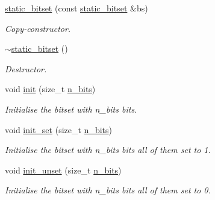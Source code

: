 \begin{DoxyCompactItemize}
\mbox{\label{classlgraph_1_1utils_1_1static__bitset_a683aec1377830f07c5d5f53f969be569}} 
\hyperlink{classlgraph_1_1utils_1_1static__bitset_a683aec1377830f07c5d5f53f969be569}{static\+\_\+bitset} (const \hyperlink{classlgraph_1_1utils_1_1static__bitset}{static\+\_\+bitset} \&bs)
\begin{DoxyCompactList}\small\item\em Copy-\/constructor. \end{DoxyCompactList}\item 
\mbox{\label{classlgraph_1_1utils_1_1static__bitset_aabbb46d8283fffa38b39204b204999be}} 
\hyperlink{classlgraph_1_1utils_1_1static__bitset_aabbb46d8283fffa38b39204b204999be}{$\sim$static\+\_\+bitset} ()
\begin{DoxyCompactList}\small\item\em Destructor. \end{DoxyCompactList}\item 
void \hyperlink{classlgraph_1_1utils_1_1static__bitset_afad1ede9e08c9d59b641150d2203edca}{init} (size\+\_\+t \hyperlink{classlgraph_1_1utils_1_1static__bitset_aebc02986838d70f13d3c10f390d11211}{n\+\_\+bits})
\begin{DoxyCompactList}\small\item\em Initialise the bitset with {\itshape n\+\_\+bits} bits. \end{DoxyCompactList}\item 
void \hyperlink{classlgraph_1_1utils_1_1static__bitset_a706ac4c15ed634b9087582cacc107acc}{init\+\_\+set} (size\+\_\+t \hyperlink{classlgraph_1_1utils_1_1static__bitset_aebc02986838d70f13d3c10f390d11211}{n\+\_\+bits})
\begin{DoxyCompactList}\small\item\em Initialise the bitset with {\itshape n\+\_\+bits} bits all of them set to 1. \end{DoxyCompactList}\item 
void \hyperlink{classlgraph_1_1utils_1_1static__bitset_a6fb4d66f266593fe9c65451bf6212591}{init\+\_\+unset} (size\+\_\+t \hyperlink{classlgraph_1_1utils_1_1static__bitset_aebc02986838d70f13d3c10f390d11211}{n\+\_\+bits})
\begin{DoxyCompactList}\small\item\em Initialise the bitset with {\itshape n\+\_\+bits} bits all of them set to 0. \end{DoxyCompactList}\item 

\end{DoxyCompactItemize}
